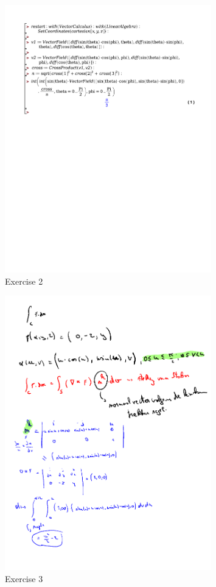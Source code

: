 \documentclass[a4paper]{report}
\begin{document}
\begin{figure}[H]
	\centering
	\includegraphics[width=0.8\textwidth]{exercises/wc_7_ex_2.pdf}
	\caption{Exercise 2}
	\label{fig:wc_7_ex_2_maple}
\end{figure}


\begin{figure}[H]
	\centering
	\includegraphics[width=0.8\textwidth]{assets/wc_7_ex_3.png}
	\caption{Exercise 3}
	\label{fig:wc_7_ex_3}
\end{figure}
\end{document}
